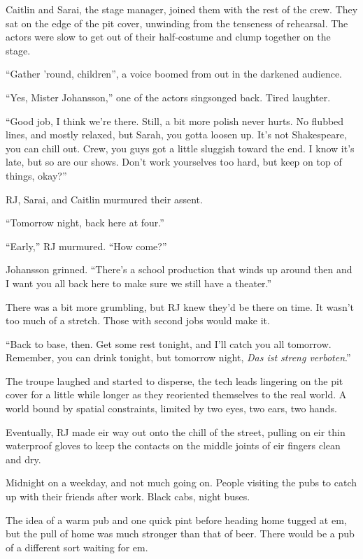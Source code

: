 Caitlin and Sarai, the stage manager, joined them with the rest of the crew. They sat on the edge of the pit cover, unwinding from the tenseness of rehearsal. The actors were slow to get out of their half-costume and clump together on the stage.

``Gather 'round, children'', a voice boomed from out in the darkened audience.

``Yes, Mister Johansson,'' one of the actors singsonged back. Tired laughter.

``Good job, I think we're there. Still, a bit more polish never hurts. No flubbed lines, and mostly relaxed, but Sarah, you gotta loosen up. It's not Shakespeare, you can chill out. Crew, you guys got a little sluggish toward the end. I know it's late, but so are our shows. Don't work yourselves too hard, but keep on top of things, okay?''

RJ, Sarai, and Caitlin murmured their assent.

``Tomorrow night, back here at four.''

``Early,'' RJ murmured. ``How come?''

Johansson grinned. ``There's a school production that winds up around then and I want you all back here to make sure we still have a theater.''

There was a bit more grumbling, but RJ knew they'd be there on time. It wasn't too much of a stretch. Those with second jobs would make it.

``Back to base, then. Get some rest tonight, and I'll catch you all tomorrow. Remember, you can drink tonight, but tomorrow night, \emph{Das ist streng verboten}.''

The troupe laughed and started to disperse, the tech leads lingering on the pit cover for a little while longer as they reoriented themselves to the real world. A world bound by spatial constraints, limited by two eyes, two ears, two hands.

Eventually, RJ made eir way out onto the chill of the street, pulling on eir thin waterproof gloves to keep the contacts on the middle joints of eir fingers clean and dry.

Midnight on a weekday, and not much going on. People visiting the pubs to catch up with their friends after work. Black cabs, night buses.

The idea of a warm pub and one quick pint before heading home tugged at em, but the pull of home was much stronger than that of beer. There would be a pub of a different sort waiting for em.

